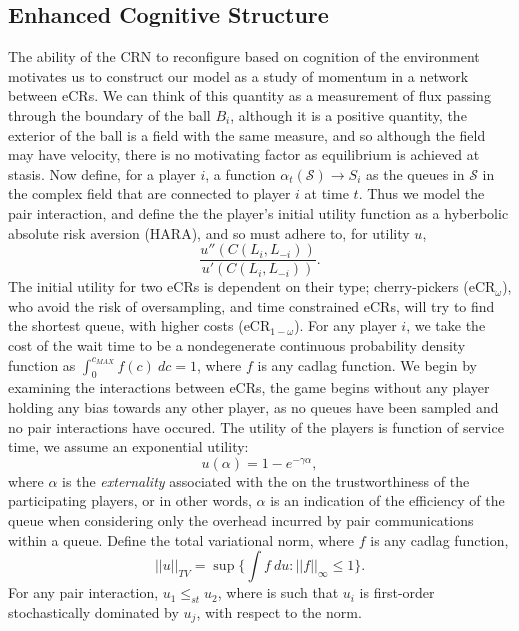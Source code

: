 \documentclass[10pt]{article}
\newcommand{\mcS}{\mathcal{S}}
\theoremstyle{definition}
\begin{document}
\subsection{Enhanced Cognitive Structure}
The ability of the CRN to reconfigure based on cognition of the environment
motivates us to construct our model as a study of momentum in a network between eCRs. 
We can think of this quantity as a measurement of flux passing through the
boundary of the ball $B_i$, although it is a positive quantity, the exterior of
the ball is a field with the same measure, and so although the field may have
velocity, there is no motivating factor as equilibrium is achieved at stasis.
Now define, for a player $i$, a function
$\alpha_t(\mcS) \longrightarrow S_i$ as the queues in $\mcS$ in the
complex field that are connected to player $i$ at time $t$. 
Thus we model the pair interaction, and define the the player's initial utility
function as a hyberbolic absolute risk aversion (HARA), and so must adhere to,
for utility $u$,
$$
    \displaystyle\frac{u''(C(L_i,L_{-i}))}{u'(C(L_i,L_{-i}))}.
$$
The initial utility for two eCRs is dependent on their type; cherry-pickers
(eCR$_{\omega}$), who
avoid the risk of oversampling, and time constrained eCRs, will try to
find the shortest queue, with higher costs (eCR$_{1-\omega}$).
For any player $i$, we take the cost of the wait time to be a nondegenerate
continuous probability density function as $\int_0^{c_{MAX}} f(c) \  dc = 1$, 
where $f$ is any cadlag function.
We begin by examining the interactions between eCRs, the game begins without any
player holding any bias towards any other player, as no queues have been
sampled and no pair interactions have occured. The utility of the players 
is function of service time, we assume an exponential utility:
$$
    u(\alpha) = 1 - e^{-\gamma \alpha},
$$
where $\alpha$ is the \emph{externality} associated with the on the trustworthiness of the
participating players, or in other words, $\alpha$ is an indication of the
efficiency of the queue when considering only the overhead incurred by pair
communications within a queue. Define the total
variational norm, where $f$ is any cadlag function,
$$
    \vert\vert u\vert\vert_{TV} = \sup\lbrace \int f \ du : \vert\vert
    f\vert\vert_\infty \le 1 \rbrace.
$$
For any pair interaction, 
$u_1 \le_{st} u_2$, where is such that $u_i$ is first-order stochastically
dominated by $u_j$, with respect to the norm. 
\end{document}
